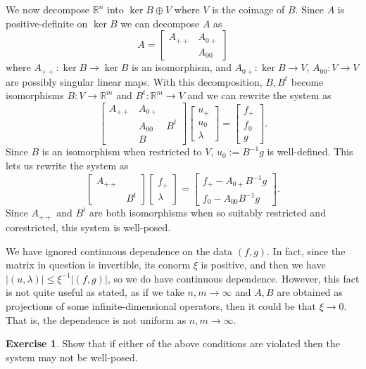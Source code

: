 \documentclass[10pt]{article}
\newcommand{\RR}{\mathbb{R}}
\theoremstyle{definition}
\newtheorem{exer}{Exercise}
\begin{document}
We now decompose $\RR^n$ into $\ker B \oplus V$ where $V$ is the coimage of $B$.
Since $A$ is positive-definite on $\ker B$ we can decompose $A$ as
$$A = \begin{bmatrix}A_{++} & A_{0+} \\ & A_{00}\end{bmatrix}$$
where $A_{++}: \ker B \to \ker B$ is an isomorphism, and $A_{0+}: \ker B \to V$, $A_{00}: V \to V$ are possibly singular linear maps.
With this decomposition, $B, B^t$ become isomorphisms $B: V \to \RR^m$ and $B^t: \RR^m \to V$ and we can rewrite the system as
$$\begin{bmatrix}A_{++} & A_{0+} \\ & A_{00} & B^t \\ & B\end{bmatrix} \begin{bmatrix} u_+ \\ u_0 \\ \lambda\end{bmatrix} = \begin{bmatrix} f_+ \\ f_0 \\ g\end{bmatrix}.$$
Since $B$ is an isomorphism when restricted to $V$, $u_0 := B^{-1}g$ is well-defined.
This lets us rewrite the system as
$$\begin{bmatrix}A_{++} \\ &B^t \end{bmatrix} \begin{bmatrix} f_+ \\ \lambda \end{bmatrix} = \begin{bmatrix} f_+ - A_{0+} B^{-1} g \\ f_0 - A_{00} B^{-1} g\end{bmatrix}.$$
Since $A_{++}$ and $B^t$ are both isomorphisms when so suitably restricted and corestricted, this system is well-posed.

We have ignored continuous dependence on the data $(f, g)$.
In fact, since the matrix in question is invertible, its conorm $\xi$ is positive, and then we have $|(u, \lambda)| \leq \xi^{-1} |(f, g)|$, so we do have continuous dependence.
However, this fact is not quite useful as stated, as if we take $n, m \to \infty$ and $A, B$ are obtained as projections of some infinite-dimensional operators, then it could be that $\xi \to 0$.
That is, the dependence is not uniform as $n, m \to \infty$.

\begin{exer}
Show that if either of the above conditions are violated then the system may not be well-posed.
\end{exer}
\end{document}
